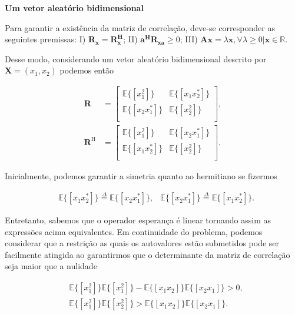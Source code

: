 \textbf{Um vetor aleatório bidimensional}

Para garantir a existência da matriz de correlação, deve-se corresponder as seguintes premissas: I) $\mathbf{R_{x}} = \mathbf{R^{H}_{x}}$; II) $\mathbf{a^{H}} \mathbf{R_{xa}} \geq 0$; III) $\mathbf{Ax} = \lambda \mathbf{x}, \forall \lambda \geq 0 | \mathbf{x} \in \mathbb{R}$.


Desse modo, considerando um vetor aleatório bidimensional descrito por $\mathbf{X} = (x_{1},x_{2})$ podemos então

\begin{align*}
    \mathbf{R} &= \left[ 
    \begin{matrix}
        \mathbb{E}\{[x^{2}_{1}]\} & \mathbb{E}\{[x_{1}x^{*}_{2}]\} \\
        \mathbb{E}\{[x_{2}x^{*}_{1}]\} & \mathbb{E}\{[x^{2}_{2}]\} \\
    \end{matrix} \right], \\
    \mathbf{R}^{\text{H}} &= \left[ 
    \begin{matrix}
        \mathbb{E}\{[x^{2}_{1}]\} & \mathbb{E}\{[x_{2}x^{*}_{1}]\} \\
        \mathbb{E}\{[x_{1}x^{*}_{2}]\} & \mathbb{E}\{[x^{2}_{2}]\} \\
    \end{matrix} \right].
\end{align*}

Inicialmente, podemos garantir a simetria quanto ao hermitiano se fizermos 

\begin{align}
    &\mathbb{E}\{[x_{1}x^{*}_{2}]\} \overset{\Delta}{=} \mathbb{E}\{[x_{2}x^{*}_{1}]\},
    &\mathbb{E}\{[x_{2}x^{*}_{1}]\} \overset{\Delta}{=} \mathbb{E}\{[x_{1}x^{*}_{2}]\}.
\end{align}

Entretanto, sabemos que o operador esperança é linear tornando assim as expressões acima equivalentes. Em continuidade do problema, podemos 
considerar que a restrição as quais os autovalores estão submetidos pode ser facilmente atingida ao garantirmos que o determinante da matriz 
de correlação seja maior que a nulidade

\begin{align}
    &\mathbb{E}\{[x^{2}_{1}]\} \mathbb{E}\{[x^{2}_{1}]\} - \mathbb{E}\{[x_{1}x_{2}]\} \mathbb{E}\{[x_{2}x_{1}]\} > 0, \\
    &\mathbb{E}\{[x_{1}^{2}]\} \mathbb{E}\{[x^{2}_{2}]\} > \mathbb{E}\{[x_{1}x_{2}]\} \mathbb{E}\{[x_{2}x_{1}]\}.
\end{align}

